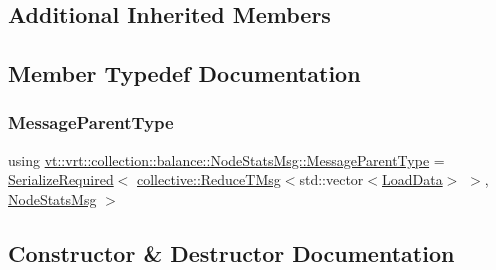 \subsection*{Additional Inherited Members}


\subsection{Member Typedef Documentation}
\mbox{\label{structvt_1_1vrt_1_1collection_1_1balance_1_1_node_stats_msg_a912b2023b2a15f0f7cf78dca8502de91}} 
\subsubsection{\texorpdfstring{Message\+Parent\+Type}{MessageParentType}}
{\footnotesize\ttfamily using \hyperlink{structvt_1_1vrt_1_1collection_1_1balance_1_1_node_stats_msg_a912b2023b2a15f0f7cf78dca8502de91}{vt\+::vrt\+::collection\+::balance\+::\+Node\+Stats\+Msg\+::\+Message\+Parent\+Type} =  \hyperlink{namespacevt_a9e60e2e8929828639383ac1d6643384d}{Serialize\+Required}$<$ \hyperlink{namespacevt_1_1collective_a28b82d5d48c9bc6e4fd738fcbf9e0f62}{collective\+::\+Reduce\+T\+Msg}$<$std\+::vector$<$\hyperlink{structvt_1_1vrt_1_1collection_1_1balance_1_1_load_data}{Load\+Data}$>$ $>$, \hyperlink{structvt_1_1vrt_1_1collection_1_1balance_1_1_node_stats_msg}{Node\+Stats\+Msg} $>$}



\subsection{Constructor \& Destructor Documentation}
\mbox{\label{structvt_1_1vrt_1_1collection_1_1balance_1_1_node_stats_msg_a4d1c09dda8b28b2ca0b96ed19ab6ee1c}} 
